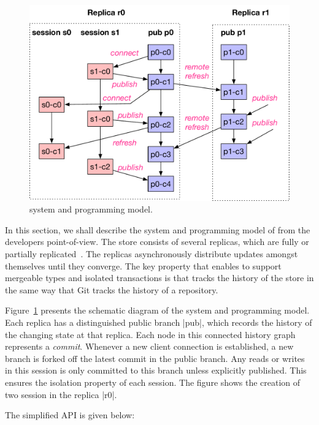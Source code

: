\begin{figure}
	\vspace{-1.3cm}
	\centering
	\includegraphics[scale=0.35]{figures/session_merge}
	\caption{\name system and programming model.}
	\vspace{-0.5cm}
	\label{fig:session_merge}
\end{figure}
In this section, we shall describe the system and programming model of \name
from the developers point-of-view. The \name store consists of several
replicas, which are fully or partially replicated~\cite{Crain15}. The replicas
asynchronously distribute updates amongst themselves until they converge. The
key property that enables \name to support mergeable types and isolated
transactions is that \name tracks the history of the store in the same way that
Git tracks the history of a repository.

Figure~\ref{fig:session_merge} presents the schematic diagram of the system and
programming model. Each replica has a distinguished public branch |pub|, which
records the history of the changing state at that replica. Each node in this
connected history graph represents a \emph{commit}. Whenever a new client
connection is established, a new branch is forked off the latest commit in the
public branch. Any reads or writes in this session is only committed to this
branch unless explicitly published. This ensures the isolation property of each
session. The figure shows the creation of two session in the replica |r0|.

The simplified \name API is given below:

